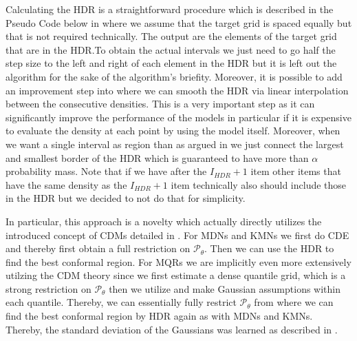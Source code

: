 Calculating the HDR is a straightforward procedure which is described in the Pseudo Code below in  where we assume that the target grid is spaced equally but that is not required technically. The output are the elements of the target grid that are in the HDR.\@ To obtain the actual intervals we just need to go half the step size to the left and right of each element in the HDR but it is left out the algorithm for the sake of the algorithm's briefity. Moreover, it is possible to add an improvement step into  where we can smooth the HDR via linear interpolation between the consecutive densities. This is a very important step as it can significantly improve the performance of the models in particular if it is expensive to evaluate the density at each point by using the model itself. Moreover, when we want a single interval as region than as argued in  we just connect the largest and smallest border of the HDR which is guaranteed to have more than $\alpha$ probability mass. Note that if we have after the $I_{HDR} + 1$ item other items that have the same density as the $I_{HDR} + 1$ item technically also should include those in the HDR but we decided to not do that for simplicity.

In particular, this approach is a novelty which actually directly utilizes the introduced concept of CDMs detailed in . For MDNs and KMNs we first do CDE and thereby first obtain a full restriction on $\mathscr{P}_\theta$. Then we can use the HDR to find the best conformal region. For MQRs we are implicitly even more extensively utilzing the CDM theory since we first estimate a dense quantile grid, which is a strong restriction on $\mathscr{P}_\theta$ then we utilize  and make Gaussian assumptions within each quantile. Thereby, we can essentially fully restrict $\mathscr{P}_\theta$ from where we can find the best conformal region by HDR again as with MDNs and KMNs. Thereby, the standard deviation of the Gaussians was learned as described in .

